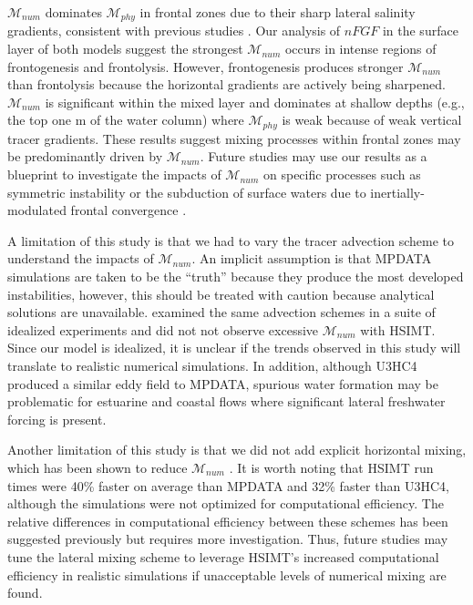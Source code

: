 \documentclass[draft]{agujournal2019}
\begin{document}
$\mathcal{M}_{num}$ dominates $\mathcal{M}_{phy}$ in frontal zones due to their sharp lateral salinity gradients, consistent with previous studies \cite{Kalra_2019, Holmes_2021, Ralston_2017, Wang_2021}. Our analysis of $nFGF$ in the surface layer of both models suggest the strongest $\mathcal{M}_{num}$ occurs in intense regions of frontogenesis and frontolysis. However, frontogenesis produces stronger $\mathcal{M}_{num}$ than frontolysis because the horizontal gradients are actively being sharpened. $\mathcal{M}_{num}$ is significant within the mixed layer and dominates at shallow depths (e.g., the top one m of the water column) where $\mathcal{M}_{phy}$ is weak because of weak vertical tracer gradients. These results suggest mixing processes within frontal zones may be predominantly driven by $\mathcal{M}_{num}$. Future studies may use our results as a blueprint to investigate the impacts of $\mathcal{M}_{num}$ on specific processes such as symmetric instability \cite{dong2021scale} or the subduction of surface waters due to inertially-modulated frontal convergence \cite{qu2022rapid}.

A limitation of this study is that we had to vary the tracer advection scheme to understand the impacts of $\mathcal{M}_{num}$. An implicit assumption is that MPDATA simulations are taken to be the ``truth'' because they produce the most developed instabilities, however, this should be treated with caution because analytical solutions are unavailable.  examined the same advection schemes in a suite of idealized experiments and did not not observe excessive $\mathcal{M}_{num}$ with HSIMT. Since our model is idealized, it is unclear if the trends observed in this study will translate to realistic numerical simulations. In addition, although U3HC4 produced a similar eddy field to MPDATA, spurious water formation may be problematic for estuarine and coastal flows where significant lateral freshwater forcing is present. 

Another limitation of this study is that we did not add explicit horizontal mixing, which has been shown to reduce $\mathcal{M}_{num}$ \cite{Griffies_2000,Holmes_2021,Ilicak_2012}. It is worth noting that HSIMT run times were 40\% faster on average than MPDATA and 32\% faster than U3HC4, although the simulations were not optimized for computational efficiency. The relative differences in computational efficiency between these schemes has been suggested previously \cite{wu2010advection, wu2023evaluation} but requires more investigation. Thus, future studies may tune the lateral mixing scheme to leverage HSIMT's increased computational efficiency in realistic simulations if unacceptable levels of numerical mixing are found. 
\end{document}
